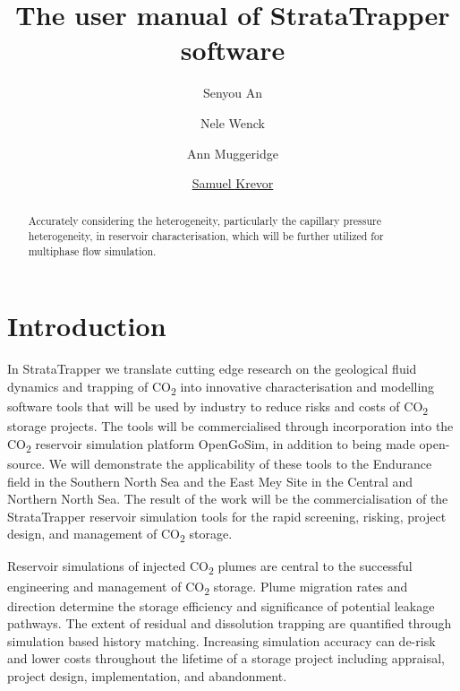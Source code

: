 \documentclass{article}
\title{The user manual of StrataTrapper software}
\author[1]{Senyou An}
\author[1]{Nele Wenck}
\author[1]{Ann Muggeridge}
\author[1]{\href{mailto:s.krevor@imperial.ac.uk}{Samuel Krevor}}
\affil[1]{Department of Earth Science and Engineering, Imperial College London, London, SW7 2AZ, UK}
\def\CO2{CO\textsubscript{2}}
\begin{document}
\maketitle

\begin{abstract}
    Accurately considering the heterogeneity, particularly the capillary pressure heterogeneity, in reservoir characterisation, which will be further utilized for  multiphase flow simulation.
\end{abstract}


\section{Introduction}

In StrataTrapper we translate cutting edge research on the geological fluid dynamics and trapping of \CO2 into innovative characterisation and modelling software tools that will be used by industry to reduce risks and costs of \CO2 storage projects. The tools will be commercialised through incorporation into the \CO2 reservoir simulation platform OpenGoSim, in addition to being made open-source. We will demonstrate the applicability of these tools to the Endurance field in the Southern North Sea and the East Mey Site in the Central and Northern North Sea. The result of the work will be the commercialisation of the StrataTrapper reservoir simulation tools for the rapid screening, risking, project design, and management of \CO2 storage.

Reservoir simulations of injected \CO2 plumes are central to the successful engineering and management of \CO2 storage. Plume migration rates and direction determine the storage efficiency and significance of potential leakage pathways. The extent of residual and dissolution trapping are quantified through simulation based history matching. Increasing simulation accuracy can de-risk and lower costs throughout the lifetime of a storage project including appraisal, project design, implementation, and abandonment.
\end{document}
